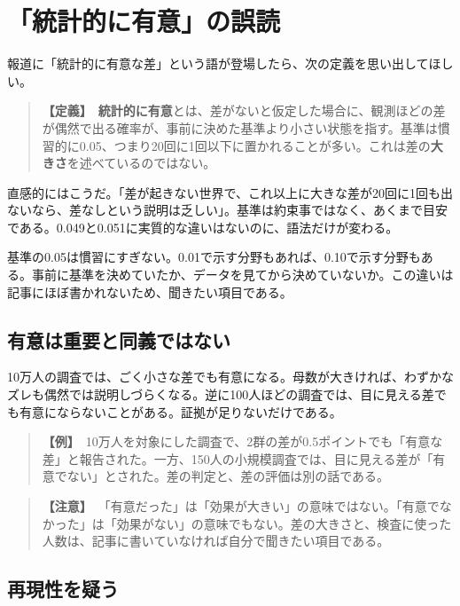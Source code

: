 \documentclass{article}
\begin{document}
\section{「統計的に有意」の誤読}

報道に「統計的に有意な差」という語が登場したら、次の定義を思い出してほしい。

\begin{quote}
\textbf{【定義】}\ \textbf{統計的に有意}とは、差がないと仮定した場合に、観測ほどの差が偶然で出る確率が、事前に決めた基準より小さい状態を指す。基準は慣習的に0.05、つまり20回に1回以下に置かれることが多い。これは差の\textbf{大きさ}を述べているのではない。
\end{quote}

直感的にはこうだ。「差が起きない世界で、これ以上に大きな差が20回に1回も出ないなら、差なしという説明は乏しい」。基準は約束事ではなく、あくまで目安である。0.049と0.051に実質的な違いはないのに、語法だけが変わる。

基準の0.05は慣習にすぎない。0.01で示す分野もあれば、0.10で示す分野もある。事前に基準を決めていたか、データを見てから決めていないか。この違いは記事にほぼ書かれないため、聞きたい項目である。

\subsection{有意は重要と同義ではない}

10万人の調査では、ごく小さな差でも有意になる。母数が大きければ、わずかなズレも偶然では説明しづらくなる。逆に100人ほどの調査では、目に見える差でも有意にならないことがある。証拠が足りないだけである。

\begin{quote}
\textbf{【例】}\ 10万人を対象にした調査で、2群の差が0.5ポイントでも「有意な差」と報告された。一方、150人の小規模調査では、目に見える差が「有意でない」とされた。差の判定と、差の評価は別の話である。
\end{quote}

\begin{quote}
\textbf{【注意】}\ 「有意だった」は「効果が大きい」の意味ではない。「有意でなかった」は「効果がない」の意味でもない。差の大きさと、検査に使った人数は、記事に書いていなければ自分で聞きたい項目である。
\end{quote}

\subsection{再現性を疑う}
\end{document}
